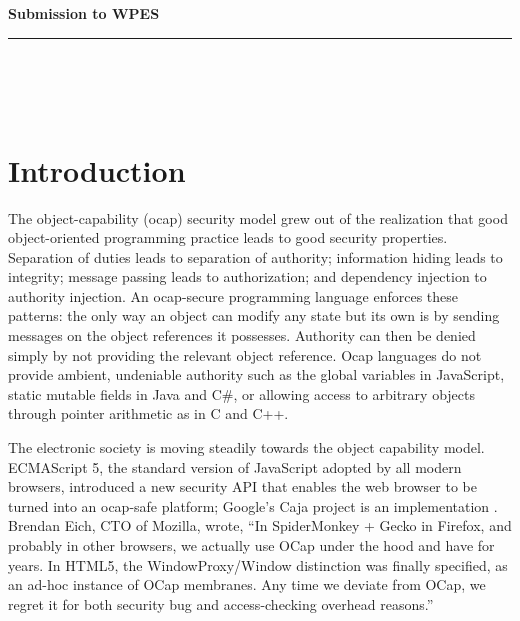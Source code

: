 \documentclass[]{acm_proc_article-sp}
\numberwithin{equation}{subsection}
\newcommand{\paperversion}{Draft Version 0.1 - July 19, 2013}
\newenvironment{toc}
{
\begin{list}{}{
   \setlength{\leftmargin}{0.4in}
   \setlength{\rightmargin}{0.6in}
   \setlength{\parskip}{0pt}
 } \item }
{\end{list}}
\begin{document}
\noindent
{\large \textbf{Submission to WPES}}\\
\rule{6.25in}{0.75pt}\\\\\\

\maketitle




\section{Introduction}

The object-capability (ocap) security model grew out of the realization
that good object-oriented programming practice leads to good security properties.
Separation of duties leads to separation of authority; information hiding
leads to integrity; message passing leads to authorization; 
and dependency injection to authority injection.  An
ocap-secure programming language enforces these patterns: the only way an
object can modify any state but its own is by sending messages on the object
references it possesses.  Authority can then be denied simply by not providing
the relevant object reference. Ocap languages do not provide ambient, undeniable 
authority such as the global variables in JavaScript,
static mutable fields in Java and C\#, or allowing access to arbitrary objects
through pointer arithmetic as in C and C++.

The electronic society is moving steadily towards the object capability model.
ECMAScript 5, the standard version of JavaScript adopted by all modern
browsers, introduced a new security API that enables the web browser to
be turned into an ocap-safe platform; Google's Caja project is an implementation
\cite{Caja:2013}.  Brendan Eich, CTO of Mozilla, wrote, ``In SpiderMonkey + Gecko in 
Firefox, and probably in other browsers, we actually use OCap under the hood 
and have for years. In HTML5, the WindowProxy/Window distinction was finally 
specified, as an ad-hoc instance of OCap membranes.  Any time we deviate from 
OCap, we regret it for both security bug and access-checking overhead reasons.''
\cite{Eich:2013}
\end{document}
